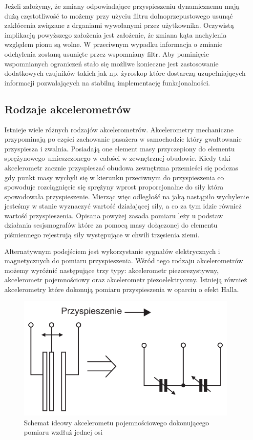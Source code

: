 Jeżeli założymy, że zmiany odpowiadające przyspieszeniu dynamicznemu mają dużą
częstotliwość to możemy przy użyciu filtru dolnoprzepustowego usunąć zakłócenia
związane z drganiami wywołanymi przez użytkownika. Oczywistą implikacją
powyższego założenia jest założenie, że zmiana kąta nachylenia względem pionu są
wolne. W przeciwnym wypadku informacja o zmianie odchylenia zostaną usunięte
przez wspomniany filtr. Aby pominięcie wspomnianych ograniczeń stało się możliwe
konieczne jest zastosowanie dodatkowych czujników takich jak np. żyroskop które
dostarczą uzupełniających informacji pozwalających na stabilną implementację
funkcjonalności.

\subsection{Rodzaje akcelerometrów}
Istnieje wiele różnych rodzajów akcelerometrów. Akcelerometry mechaniczne
przypominają po części zachowanie pasażera w samochodzie który gwałtowanie
przyspiesza i zwalnia. Posiadają one element masy przyczepiony do elementu
sprężynowego umieszczonego w całości w zewnętrznej obudowie. Kiedy taki
akcelerometr zacznie przyspieszać obudowa zewnętrzna przemieści się podczas gdy
punkt masy wychyli się w kierunku przeciwnym do przyspieszenia co spowoduje
rozciągnięcie się sprężyny wprost proporcjonalne do siły która spowodowała
przyspieszenie. Mierząc więc odległość na jaką nastąpiło wychylenie jesteśmy w
stanie wyznaczyć wartość działającej siły, a co za tym idzie również wartość
przyspieszenia. Opisana powyżej zasada pomiaru leży u podstaw działania
sesjsmografów które za pomocą masy dołączonej do elementu piśmiennego rejestrują
siły występujące w chwili trzęsienia ziemi.

Alternatywnym podejściem jest wykorzystanie sygnałów elektrycznych i
magnetycznych do pomiaru przyspieszenia. Wśród tego rodzaju akcelerometrów
możemy wyróżnić następujące trzy typy: akcelerometr piezorezystywny,
akcelerometr pojemnościowy oraz akcelerometr piezoelektryczny. Istnieją również
akcelerometry które dokonują pomiaru przyspieszenia w oparciu o efekt Halla. 

\begin{figure}[h!]
 \centering
 \includegraphics[height=62mm]{../images/ch04/acc_intro.png}
 \caption{Schemat ideowy akcelerometu pojemnościowego dokonującego pomiaru
 wzdłuż jednej osi\cite{ElektronikaPraktyczna22010}}
 \label{fig:AkcelerometrIdeowyScheamt}
\end{figure}

